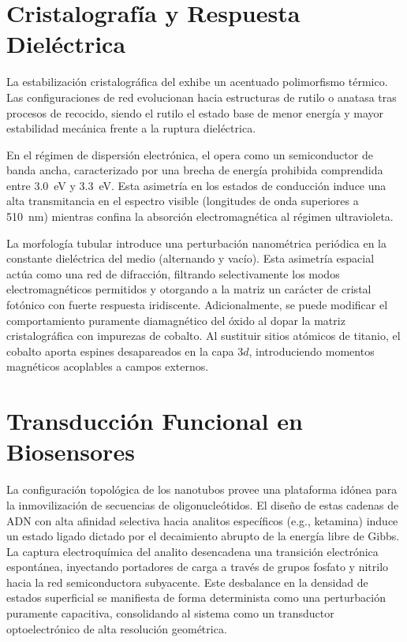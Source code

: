 \documentclass[pdflatex,sn-mathphys-num]{sn-jnl}
\theoremstyle{thmstyleone}%
\theoremstyle{thmstyletwo}%
\theoremstyle{thmstylethree}%
\begin{document}
\section{Cristalografía y Respuesta Dieléctrica}
\label{sec:cristalografia}

La estabilización cristalográfica del  exhibe un acentuado
polimorfismo térmico. Las configuraciones de red evolucionan hacia estructuras
de rutilo o anatasa tras procesos de recocido, siendo el rutilo el estado base
de menor energía y mayor estabilidad mecánica frente a la ruptura dieléctrica.

En el régimen de dispersión electrónica, el  opera como un
semiconductor de banda ancha, caracterizado por una brecha de energía prohibida
comprendida entre \qty{3.0}{\electronvolt} y \qty{3.3}{\electronvolt}.
Esta asimetría en los estados de conducción induce una alta
transmitancia en el espectro visible (longitudes de onda superiores a
\qty{510}{\nano\meter}) mientras confina la absorción electromagnética al
régimen ultravioleta.

La morfología tubular introduce una perturbación nanométrica periódica en la
constante dieléctrica del medio (alternando  y vacío). Esta asimetría
espacial actúa como una red de difracción, filtrando selectivamente los modos
electromagnéticos permitidos y otorgando a la matriz un carácter de cristal
fotónico con fuerte respuesta iridiscente.
Adicionalmente, se puede modificar el comportamiento puramente diamagnético del
óxido al dopar la matriz cristalográfica con impurezas de cobalto. Al sustituir
sitios atómicos de titanio, el cobalto aporta espines desapareados en la capa
$3d$, introduciendo momentos magnéticos acoplables a campos externos.

\section{Transducción Funcional en Biosensores}
\label{sec:biosensores}

La configuración topológica de los nanotubos provee una plataforma idónea para
la inmovilización de secuencias de oligonucleótidos. El diseño
de estas cadenas de ADN con alta afinidad selectiva hacia analitos específicos
(e.g., ketamina) induce un estado ligado dictado por el decaimiento abrupto de
la energía libre de Gibbs. La captura electroquímica del
analito desencadena una transición electrónica espontánea, inyectando
portadores de carga a través de grupos fosfato y nitrilo hacia la red
semiconductora subyacente. Este desbalance en la densidad de
estados superficial se manifiesta de forma determinista como una perturbación
puramente capacitiva, consolidando al sistema como un transductor
optoelectrónico de alta resolución geométrica.
\end{document}
